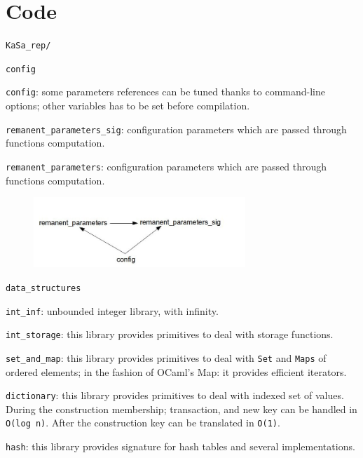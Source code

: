 \documentclass{article}
\begin{document}
\section{Code}

\verb|KaSa_rep/|
\begin{e}
\item \verb|config|
\begin{i}
\item \verb|config|: some parameters references can be tuned thanks to
  command-line options; other variables has to be set before compilation.
\item \verb|remanent_parameters_sig|: configuration parameters which are passed
  through functions computation.
\item \verb|remanent_parameters|: configuration parameters which are passed
  through functions computation.
\end{i}

\begin{figure}[ht!]
\centering
\includegraphics[width=80mm]{config.jpg}
\end{figure}

\item \verb|data_structures|

\begin{i}
\item \verb|int_inf|: unbounded integer library, with infinity.
\item \verb|int_storage|: this library provides primitives to deal with
  storage functions.
\item \verb|set_and_map|: this library provides primitives to deal with
  \verb|Set| and \verb|Maps| of ordered elements; in the fashion of OCaml's
  Map: it provides efficient iterators.
\item \verb|dictionary|: this library provides primitives to deal with
  indexed set of values. During the construction membership; transaction,
  and new key can be handled in \verb|O(log n)|. After the construction key can
  be translated in \verb|O(1)|.
\item \verb|hash|: this library provides signature for hash tables and
  several implementations.
\end{i}


\end{e}
\end{document}
